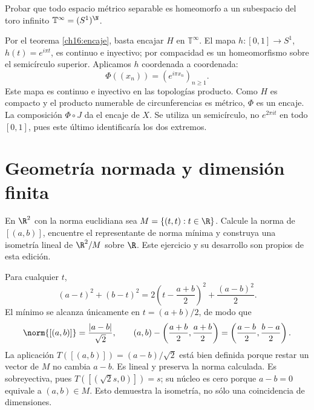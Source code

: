 \begin{ejercicio}\label{ej:lectura-16-5}
Probar que todo espacio métrico separable es homeomorfo a un subespacio del toro infinito $\mathbb T^\infty=(S^1)^{\N}$.
\end{ejercicio}
\begin{solucion}
Por el teorema \ref{ch16:encaje}, basta encajar $H$ en $\mathbb T^\infty$. El mapa $h:[0,1]\to S^1$, $h(t)=e^{i\pi t}$, es continuo e inyectivo; por compacidad es un homeomorfismo sobre el semicírculo superior. Aplicamos $h$ coordenada a coordenada:
\[
\Phi((x_n))=(e^{i\pi x_n})_{n\ge1}.
\]
Este mapa es continuo e inyectivo en las topologías producto. Como $H$ es compacto y el producto numerable de circunferencias es métrico, $\Phi$ es un encaje. La composición $\Phi\circ J$ da el encaje de $X$. Se utiliza un semicírculo, no $e^{2\pi it}$ en todo $[0,1]$, pues este último identificaría los dos extremos.
\end{solucion}

\chapter{Geometría normada y dimensión finita}

\begin{ejercicio}\label{ej:ampl-cocientes-1}
En $\R^2$ con la norma euclidiana sea $M=\{(t,t):t\in\R\}$. Calcule la norma de $[(a,b)]$, encuentre el representante de norma mínima y construya una isometría lineal de $\R^2/M$ sobre $\R$. Este ejercicio y su desarrollo son propios de esta edición.
\end{ejercicio}
\begin{solucion}
Para cualquier $t$,
\[
 (a-t)^2+(b-t)^2
 =2\left(t-\frac{a+b}{2}\right)^2+\frac{(a-b)^2}{2}.
\]
El mínimo se alcanza únicamente en $t=(a+b)/2$, de modo que
\[
 \norm{[(a,b)]}=\frac{|a-b|}{\sqrt2},\qquad
 (a,b)-\left(\frac{a+b}{2},\frac{a+b}{2}\right)
 =\left(\frac{a-b}{2},\frac{b-a}{2}\right).
\]
La aplicación $T([(a,b)])=(a-b)/\sqrt2$ está bien definida porque restar un vector de $M$ no cambia $a-b$. Es lineal y preserva la norma calculada. Es sobreyectiva, pues $T([(\sqrt2s,0)])=s$; su núcleo es cero porque $a-b=0$ equivale a $(a,b)\in M$. Esto demuestra la isometría, no sólo una coincidencia de dimensiones.
\end{solucion}

